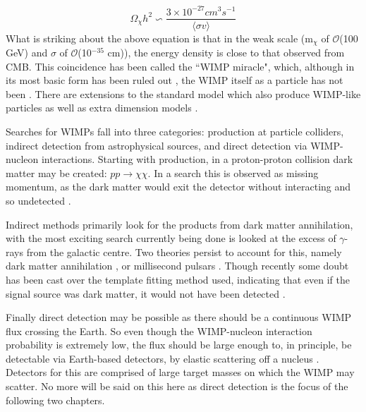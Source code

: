 \begin{equation}
    \Omega_\chi h^2 \backsim \frac{3\times 10^{-27} cm^3s^{-1}}{ \langle \sigma v \rangle}
\end{equation}
What is striking about the above equation is that in the weak scale (m$_\chi$ of $\mathcal{O}$(100 GeV) and $\sigma$ of $\mathcal{O}$(10$^{-35}$ cm)), the energy density is close to that observed from CMB.
This coincidence has been called the ``WIMP miracle", which, although in its most basic form has been ruled out \cite{less_of_a_wimp_miracle_ref}, the WIMP itself as a particle has not been \cite{wimp_theory_ref}.
There are extensions to the standard model which also produce WIMP-like particles \cite{supersymetry_wimpy_boi_ref,supersymetry_wimpy_again_ref} as well as extra dimension models \cite{extradimention_wimps_ref}.

\par
Searches for WIMPs fall into three categories: production at particle colliders, indirect detection from astrophysical sources, and direct detection via WIMP-nucleon interactions.
Starting with production, in a proton-proton collision dark matter may be created: $pp\xrightarrow{}\chi\chi$.
In a search this is observed as missing momentum, as the dark matter would exit the detector without interacting and so undetected \cite{lhc_darkmatter_ref}.
\par
Indirect methods primarily look for the products from dark matter annihilation, with the most exciting search currently being done is looked at the excess of $\gamma$-rays from the galactic centre.
Two theories persist to account for this, namely dark matter annihilation \cite{galactic_gamma_excess_1_ref, galactic_gamma_excess_2_ref}, or millisecond pulsars \cite{galactic_gamma_excess_3_ref, galactic_gamma_excess_4_ref}.
Though recently some doubt has been cast over the template fitting method used, indicating that even if the signal source was dark matter, it would not have been detected \cite{galactic_gamma_excess_5_ref}.
\par
Finally direct detection may be possible as there should be a continuous WIMP flux crossing the Earth.
So even though the WIMP-nucleon interaction probability is extremely low, the flux should be large enough to, in principle, be detectable via Earth-based detectors, by elastic scattering off a nucleus \cite{wimp_nucleon_interactions_first_suggestion_ref,supersymmetric_dark_matter_ref}.
Detectors for this are comprised of large target masses on which the WIMP may scatter.
No more will be said on this here as direct detection is the focus of the following two chapters.

